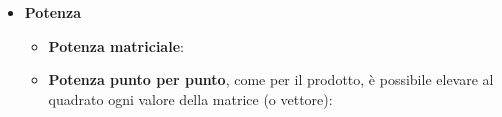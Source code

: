\documentclass[a4paper]{article}
\begin{document}
\begin{itemize}
        \item \textbf{Potenza}
        \begin{itemize}
            \item \textbf{Potenza matriciale}:
            

            \item \textbf{Potenza punto per punto}, come per il prodotto, è possibile elevare al quadrato ogni valore della matrice (o vettore):
            
        \end{itemize}
    \end{itemize}

    \newpage
\end{document}
